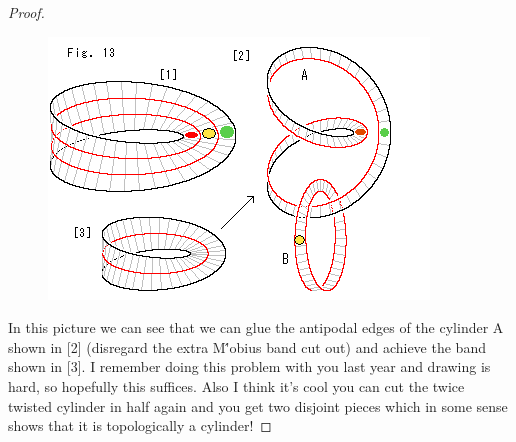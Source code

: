 \documentclass[leqno]{article}
\theoremstyle{nonumberplain}
\newtheorem{proof}{Proof}
\begin{document}
\begin{proof}
\begin{figure}[h]
\includegraphics[scale=1]{mobius.png}
\end{figure}
In this picture we can see that we can glue the antipodal edges of the cylinder A shown in [2] (disregard the extra M{\''o}bius band cut out) and achieve the band shown in [3].  I remember doing this problem with you last year and drawing is hard, so hopefully this suffices.  Also I think it's cool you can cut the twice twisted cylinder in half again and you get two disjoint pieces which in some sense shows that it is topologically a cylinder!
\end{proof}


\pagebreak
\end{document}
